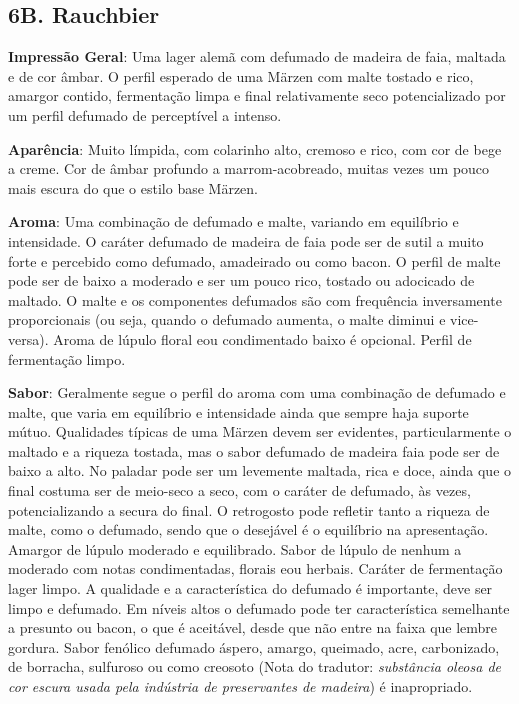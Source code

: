 \subsection*{6B. Rauchbier}
\textbf{Impressão Geral}: Uma lager alemã com defumado de madeira de faia, maltada e de cor âmbar. O perfil esperado de uma Märzen com malte tostado e rico, amargor contido, fermentação limpa e final relativamente seco potencializado por um perfil defumado de perceptível a intenso.

\textbf{Aparência}: Muito límpida, com colarinho alto, cremoso e rico, com cor de bege a creme. Cor de âmbar profundo a marrom-acobreado, muitas vezes um pouco mais escura do que o estilo base Märzen.

\textbf{Aroma}: Uma combinação de defumado e malte, variando em equilíbrio e intensidade. O caráter defumado de madeira de faia pode ser de sutil a muito forte e percebido como defumado, amadeirado ou como bacon. O perfil de malte pode ser de baixo a moderado e ser um pouco rico, tostado ou adocicado de maltado. O malte e os componentes defumados são com frequência inversamente proporcionais (ou seja, quando o defumado aumenta, o malte diminui e vice-versa). Aroma de lúpulo floral e\/ou condimentado baixo é opcional. Perfil de fermentação limpo.

\textbf{Sabor}: Geralmente segue o perfil do aroma com uma combinação de defumado e malte, que varia em equilíbrio e intensidade ainda que sempre haja suporte mútuo. Qualidades típicas de uma Märzen devem ser evidentes, particularmente o maltado e a riqueza tostada, mas o sabor defumado de madeira faia pode ser de baixo a alto. No paladar pode ser um levemente maltada, rica e doce, ainda que o final costuma ser de meio-seco a seco, com o caráter de defumado, às vezes, potencializando a secura do final. O retrogosto pode refletir tanto a riqueza de malte, como o defumado, sendo que o desejável é o equilíbrio na apresentação. Amargor de lúpulo moderado e equilibrado. Sabor de lúpulo de nenhum a moderado com notas condimentadas, florais e\/ou herbais. Caráter de fermentação lager limpo. A qualidade e a característica do defumado é importante, deve ser limpo e defumado. Em níveis altos o defumado pode ter característica semelhante a presunto ou bacon, o que é aceitável, desde que não entre na faixa que lembre gordura. Sabor fenólico defumado áspero, amargo, queimado, acre, carbonizado, de borracha, sulfuroso ou como creosoto (Nota do tradutor: \textit{substância oleosa de cor escura usada pela indústria de preservantes de madeira}) é inapropriado.

